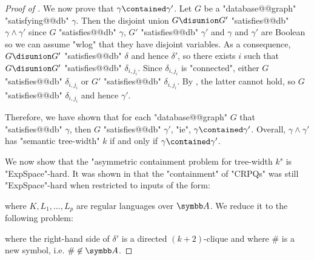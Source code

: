 \begin{proof}[Proof of ]
    We now prove that $\gamma \contained \gamma'$. Let $G$ be a
    "database@@graph" "satisfying@@db" $\gamma$. Then the disjoint union $G \disunion G'$ "satisfies@@db" $\gamma \land \gamma'$
    since $G$ "satisfies@@db" $\gamma$, $G'$ "satisfies@@db" $\gamma'$ and $\gamma$ and $\gamma'$
    are Boolean so we can assume "wlog" that they have disjoint variables.
    As a consequence, $G \disunion G'$ "satisfies@@db" $\delta$ and hence $\delta'$,
    so there exists $i$ such that $G \disunion G'$ "satisfies@@db" $\delta_{i,j_i}$.
    Since $\delta_{i,j_i}$ is "connected", either $G$ "satisfies@@db"
    $\delta_{i,j_i}$ or $G'$ "satisfies@@db" $\delta_{i,j_i}$.
    By , the latter cannot hold,
    so $G$ "satisfies@@db" $\delta_{i,j_i}$ and hence $\gamma'$.

    Therefore, we have shown that for each "database@@graph" $G$ that "satisfies@@db" 
    $\gamma$, then $G$ "satisfies@@db" $\gamma'$, "ie", $\gamma \contained \gamma'$. Overall,
    $\gamma \land \gamma'$ has "semantic tree-width" $k$ if and only if
    $\gamma \contained \gamma'$.

    \medskip

    We now show that the "asymmetric containment problem for tree-width $k$" is
    "ExpSpace"-hard.
    It was shown in \cite[Lemma 8]{Figueira2020Containment} that
    the "containment" of "CRPQs" was still "ExpSpace"-hard
    when restricted to inputs of the form:
    \begin{center}
    \end{center}
    where $K,L_1,\dotsc,L_p$ are regular languages over $\A$.
    We reduce it to the following problem:
    \begin{center}
    \end{center}
    where the right-hand side of $\delta'$ is a directed $(k+2)$-clique
    and where $\#$ is a new symbol, i.e. $\# \not\in \A$.


\end{proof}
